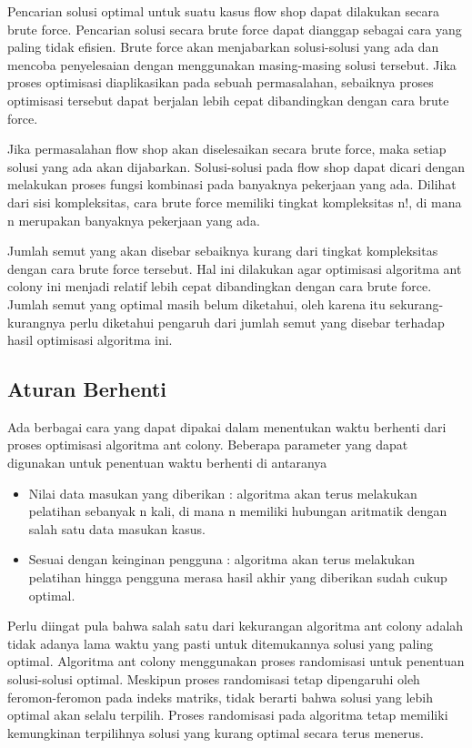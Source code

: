 	Pencarian solusi optimal untuk suatu kasus flow shop dapat dilakukan secara brute force.
	Pencarian solusi secara brute force dapat dianggap sebagai cara yang paling tidak efisien. Brute
	force akan menjabarkan solusi-solusi yang ada dan mencoba penyelesaian dengan menggunakan
	masing-masing solusi tersebut. Jika proses optimisasi diaplikasikan pada sebuah permasalahan,
	sebaiknya proses optimisasi tersebut dapat berjalan lebih cepat dibandingkan dengan cara brute
	force.
	
	Jika permasalahan flow shop akan diselesaikan secara brute force, maka setiap solusi
	yang ada akan dijabarkan. Solusi-solusi pada flow shop dapat dicari dengan melakukan
	proses fungsi kombinasi pada banyaknya pekerjaan yang ada. Dilihat dari sisi kompleksitas, cara
	brute force memiliki tingkat kompleksitas n!, di mana n merupakan banyaknya pekerjaan yang ada.
	
	Jumlah semut yang akan disebar sebaiknya kurang dari tingkat kompleksitas dengan cara brute
	force tersebut. Hal ini dilakukan agar optimisasi algoritma ant colony ini menjadi relatif lebih cepat
	dibandingkan dengan cara brute force. Jumlah semut yang optimal masih belum diketahui, oleh
	karena itu sekurang-kurangnya perlu diketahui pengaruh dari jumlah semut yang disebar terhadap
	hasil optimisasi algoritma ini.
	
	
	\subsection{Aturan Berhenti}
	
	Ada berbagai cara yang dapat dipakai dalam menentukan waktu berhenti dari proses optimisasi
	algoritma ant colony. Beberapa parameter yang dapat digunakan untuk penentuan waktu berhenti
	di antaranya
	\begin{itemize}
		\item Nilai data masukan yang diberikan : algoritma akan terus melakukan pelatihan sebanyak n
		kali, di mana n memiliki hubungan aritmatik dengan salah satu data masukan kasus.
		\item Sesuai dengan keinginan pengguna : algoritma akan terus melakukan pelatihan hingga pengguna
		merasa hasil akhir yang diberikan sudah cukup optimal.
	\end{itemize}
	Perlu diingat pula bahwa salah satu dari kekurangan algoritma ant colony adalah tidak adanya
	lama waktu yang pasti untuk ditemukannya solusi yang paling optimal. Algoritma ant colony
	menggunakan proses randomisasi untuk penentuan solusi-solusi optimal. Meskipun proses randomisasi
	tetap dipengaruhi oleh feromon-feromon pada indeks matriks, tidak berarti bahwa solusi yang
	lebih optimal akan selalu terpilih. Proses randomisasi pada algoritma tetap memiliki kemungkinan
	terpilihnya solusi yang kurang optimal secara terus menerus.
	
